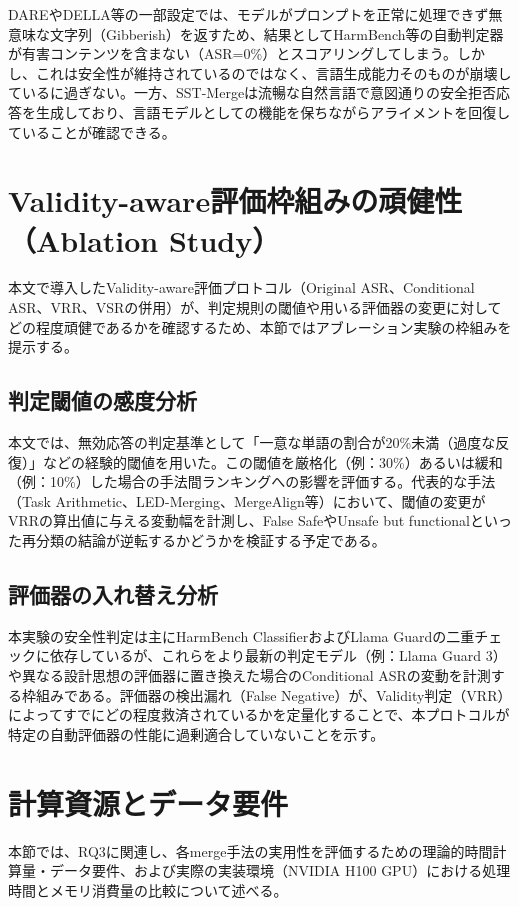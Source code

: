 \documentclass{article}
\begin{document}
DAREやDELLA等の一部設定では、モデルがプロンプトを正常に処理できず無意味な文字列（Gibberish）を返すため、結果としてHarmBench等の自動判定器が有害コンテンツを含まない（ASR=0\%）とスコアリングしてしまう。しかし、これは安全性が維持されているのではなく、言語生成能力そのものが崩壊しているに過ぎない。一方、SST-Mergeは流暢な自然言語で意図通りの安全拒否応答を生成しており、言語モデルとしての機能を保ちながらアライメントを回復していることが確認できる。



\section{Validity-aware評価枠組みの頑健性（Ablation Study）}
\label{app:validity_ablation}

本文で導入したValidity-aware評価プロトコル（Original ASR、Conditional ASR、VRR、VSRの併用）が、判定規則の閾値や用いる評価器の変更に対してどの程度頑健であるかを確認するため、本節ではアブレーション実験の枠組みを提示する。

\subsection{判定閾値の感度分析}
本文では、無効応答の判定基準として「一意な単語の割合が20\%未満（過度な反復）」などの経験的閾値を用いた。この閾値を厳格化（例：30\%）あるいは緩和（例：10\%）した場合の手法間ランキングへの影響を評価する。代表的な手法（Task Arithmetic、LED-Merging、MergeAlign等）において、閾値の変更がVRRの算出値に与える変動幅を計測し、False SafeやUnsafe but functionalといった再分類の結論が逆転するかどうかを検証する予定である。

\subsection{評価器の入れ替え分析}
本実験の安全性判定は主にHarmBench ClassifierおよびLlama Guardの二重チェックに依存しているが、これらをより最新の判定モデル（例：Llama Guard 3）や異なる設計思想の評価器に置き換えた場合のConditional ASRの変動を計測する枠組みである。評価器の検出漏れ（False Negative）が、Validity判定（VRR）によってすでにどの程度救済されているかを定量化することで、本プロトコルが特定の自動評価器の性能に過剰適合していないことを示す。

\section{計算資源とデータ要件}
\label{app:計算資源とデータ要件}
本節では、RQ3に関連し、各merge手法の実用性を評価するための理論的時間計算量・データ要件、および実際の実装環境（NVIDIA H100 GPU）における処理時間とメモリ消費量の比較について述べる。
\end{document}
